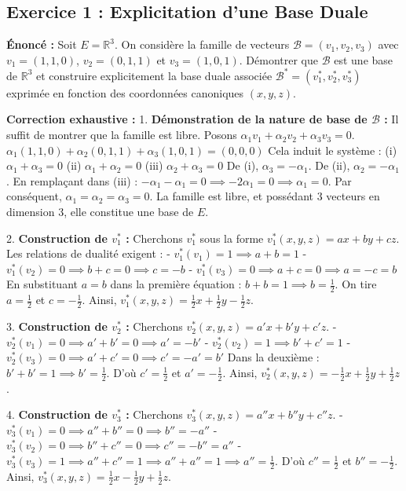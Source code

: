 \documentclass[11pt,a4paper]{report}
\begin{document}
\subsection{Exercice 1 : Explicitation d'une Base Duale}
\textbf{Énoncé :}
Soit $E = \mathbb{R}^3$. On considère la famille de vecteurs $\mathcal{B} = (v_1, v_2, v_3)$ avec $v_1 = (1, 1, 0)$, $v_2 = (0, 1, 1)$ et $v_3 = (1, 0, 1)$. Démontrer que $\mathcal{B}$ est une base de $\mathbb{R}^3$ et construire explicitement la base duale associée $\mathcal{B}^* = (v_1^*, v_2^*, v_3^*)$ exprimée en fonction des coordonnées canoniques $(x, y, z)$.

\textbf{Correction exhaustive :}
1. \textbf{Démonstration de la nature de base de $\mathcal{B}$ :}
   Il suffit de montrer que la famille est libre. Posons $\alpha_1 v_1 + \alpha_2 v_2 + \alpha_3 v_3 = 0$.
   $\alpha_1(1, 1, 0) + \alpha_2(0, 1, 1) + \alpha_3(1, 0, 1) = (0, 0, 0)$
   Cela induit le système :
   (i) $\alpha_1 + \alpha_3 = 0$
   (ii) $\alpha_1 + \alpha_2 = 0$
   (iii) $\alpha_2 + \alpha_3 = 0$
   De (i), $\alpha_3 = -\alpha_1$. De (ii), $\alpha_2 = -\alpha_1$. En remplaçant dans (iii) : $-\alpha_1 - \alpha_1 = 0 \implies -2\alpha_1 = 0 \implies \alpha_1 = 0$.
   Par conséquent, $\alpha_1 = \alpha_2 = \alpha_3 = 0$. La famille est libre, et possédant 3 vecteurs en dimension 3, elle constitue une base de $E$.

2. \textbf{Construction de $v_1^*$ :}
   Cherchons $v_1^*$ sous la forme $v_1^*(x, y, z) = ax + by + cz$. Les relations de dualité exigent :
   - $v_1^*(v_1) = 1 \implies a + b = 1$
   - $v_1^*(v_2) = 0 \implies b + c = 0 \implies c = -b$
   - $v_1^*(v_3) = 0 \implies a + c = 0 \implies a = -c = b$
   En substituant $a = b$ dans la première équation : $b + b = 1 \implies b = \frac{1}{2}$. On tire $a = \frac{1}{2}$ et $c = -\frac{1}{2}$.
   Ainsi, $v_1^*(x, y, z) = \frac{1}{2}x + \frac{1}{2}y - \frac{1}{2}z$.

3. \textbf{Construction de $v_2^*$ :}
   Cherchons $v_2^*(x, y, z) = a'x + b'y + c'z$.
   - $v_2^*(v_1) = 0 \implies a' + b' = 0 \implies a' = -b'$
   - $v_2^*(v_2) = 1 \implies b' + c' = 1$
   - $v_2^*(v_3) = 0 \implies a' + c' = 0 \implies c' = -a' = b'$
   Dans la deuxième : $b' + b' = 1 \implies b' = \frac{1}{2}$. D'où $c' = \frac{1}{2}$ et $a' = -\frac{1}{2}$.
   Ainsi, $v_2^*(x, y, z) = -\frac{1}{2}x + \frac{1}{2}y + \frac{1}{2}z$.

4. \textbf{Construction de $v_3^*$ :}
   Cherchons $v_3^*(x, y, z) = a''x + b''y + c''z$.
   - $v_3^*(v_1) = 0 \implies a'' + b'' = 0 \implies b'' = -a''$
   - $v_3^*(v_2) = 0 \implies b'' + c'' = 0 \implies c'' = -b'' = a''$
   - $v_3^*(v_3) = 1 \implies a'' + c'' = 1 \implies a'' + a'' = 1 \implies a'' = \frac{1}{2}$.
   D'où $c'' = \frac{1}{2}$ et $b'' = -\frac{1}{2}$.
   Ainsi, $v_3^*(x, y, z) = \frac{1}{2}x - \frac{1}{2}y + \frac{1}{2}z$.
\end{document}

